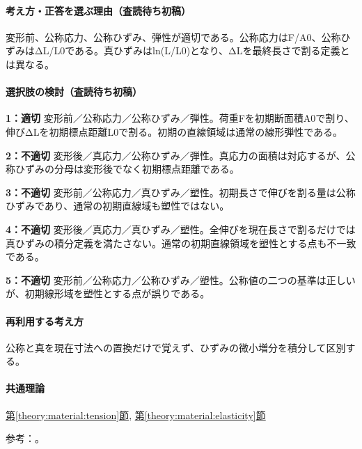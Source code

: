 \paragraph{考え方・正答を選ぶ理由（査読待ち初稿）} 変形前、公称応力、公称ひずみ、弾性が適切である。公称応力はF/A0、公称ひずみはΔL/L0である。真ひずみはln(L/L0)となり、ΔLを最終長さで割る定義とは異なる。

\paragraph{選択肢の検討（査読待ち初稿）}\mbox{}\par

\noindent\textbf{1：適切} 変形前／公称応力／公称ひずみ／弾性。荷重Fを初期断面積A0で割り、伸びΔLを初期標点距離L0で割る。初期の直線領域は通常の線形弾性である。\par

\noindent\textbf{2：不適切} 変形後／真応力／公称ひずみ／弾性。真応力の面積は対応するが、公称ひずみの分母は変形後でなく初期標点距離である。\par

\noindent\textbf{3：不適切} 変形前／公称応力／真ひずみ／塑性。初期長さで伸びを割る量は公称ひずみであり、通常の初期直線域も塑性ではない。\par

\noindent\textbf{4：不適切} 変形後／真応力／真ひずみ／塑性。全伸びを現在長さで割るだけでは真ひずみの積分定義を満たさない。通常の初期直線領域を塑性とする点も不一致である。\par

\noindent\textbf{5：不適切} 変形前／公称応力／公称ひずみ／塑性。公称値の二つの基準は正しいが、初期線形域を塑性とする点が誤りである。\par

\paragraph{再利用する考え方} 公称と真を現在寸法への置換だけで覚えず、ひずみの微小増分を積分して区別する。

\paragraph{共通理論} \hyperref[theory:material:tension]{第\ref*{theory:material:tension}節}, \hyperref[theory:material:elasticity]{第\ref*{theory:material:elasticity}節}

\par 参考：\cite{mit_material_stressstrain2001,mit_material_elastic2000}。

